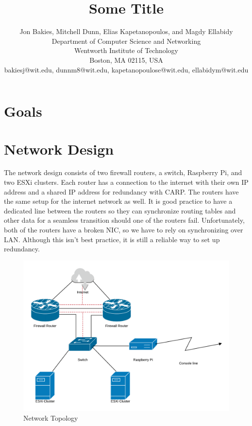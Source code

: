 \documentclass[12pt]{IEEEtran}
\begin{document}
\title{Some Title}
\author{
Jon Bakies, Mitchell Dunn, Elias Kapetanopoulos, and Magdy Ellabidy \\
Department of Computer Science and Networking \\
Wentworth Institute of Technology \\
Boston, MA 02115, USA \\
bakiesj@wit.edu, dunnm8@wit.edu, kapetanopoulose@wit.edu, ellabidym@wit.edu
} 

\maketitle
\clearpage

\section{Goals}

\section{Network Design}
The network design consists of two firewall routers, a switch, Raspberry Pi, and two ESXi clusters.
Each router has a connection to the internet with their own IP address and a shared IP address for redundancy with CARP.
The routers have the same setup for the internet network as well.
It is good practice to have a dedicated line between the routers so they can synchronize routing tables and other data for a seamless transition should one of the routers fail.
Unfortunately, both of the routers have a broken NIC, so we have to rely on synchronizing over LAN.
Although this isn't best practice, it is still a reliable way to set up redundancy.



\begin{figure}[t]
	\centering
	\includegraphics[width=\textwidth]{topology.png}
	\caption{Network Topology}
\end{figure}
\end{document}
